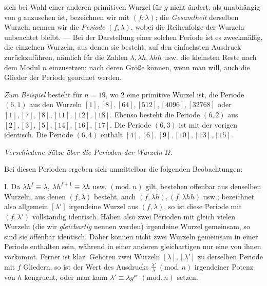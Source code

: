 sich bei Wahl einer anderen primitiven Wurzel für \(g\) nicht ändert, als unabhängig von \(g\) anzusehen ist, bezeichnen wir mit \((f;\allowbreak \lambda)\); die \textit{Gesamtheit} derselben Wurzeln nennen wir die \textit{Periode} \((f,\allowbreak \lambda)\), wobei die Reihenfolge der Wurzeln unbeachtet bleibt. — Bei der Darstellung einer solchen Periode ist es zweckmäßig, die einzelnen Wurzeln, aus denen sie besteht, auf den einfachsten Ausdruck zurückzuführen, nämlich für die Zahlen \(\lambda,\allowbreak \lambda h,\allowbreak \lambda hh\) usw. die kleinsten Reste nach dem Modul \(n\) einzusetzen; nach deren Größe können, wenn man will, auch die Glieder der Periode geordnet werden.

\textit{Zum Beispiel} besteht für \(n=19\), wo \(2\) eine primitive Wurzel ist, die Periode \((6,\allowbreak 1)\) aus den Wurzeln \([1],\allowbreak [8],\allowbreak [64],\allowbreak [512],\allowbreak [4096],\allowbreak [32768]\) oder \([1],\allowbreak [7],\allowbreak [8],\allowbreak [11],\allowbreak [12],\allowbreak [18]\). Ebenso besteht die Periode \((6,\allowbreak 2)\) aus \([2],\allowbreak [3],\allowbreak [5],\allowbreak [14],\allowbreak [16],\allowbreak [17]\). Die Periode \((6,\allowbreak 3)\) ist mit der vorigen identisch. Die Periode \((6,\allowbreak 4)\) enthält \([4],\allowbreak [6],\allowbreak [9],\allowbreak [10],\allowbreak [13],\allowbreak [15]\).

\begin{center}\textit{Verschiedene Sätze über die Perioden der Wurzeln \(\Omega\).}\end{center}


Bei diesen Perioden ergeben sich unmittelbar die folgenden Beobachtungen:

I. Da \(\lambda h^f\equiv\lambda,\allowbreak \ \lambda h^{f+1}\equiv\lambda h\) usw. \((\mathrm{mod.}\ n)\) gilt, bestehen offenbar aus denselben Wurzeln, aus denen \((f,\allowbreak \lambda)\) besteht, auch \((f,\allowbreak \lambda h),\allowbreak (f,\allowbreak \lambda hh)\) usw.; bezeichnet also allgemein \([\lambda']\) irgendeine Wurzel aus \((f,\allowbreak \lambda)\), so ist diese Periode mit \((f,\allowbreak \lambda')\) vollständig identisch. Haben also zwei Perioden mit gleich vielen Wurzeln (die wir \textit{gleichartig} nennen werden) irgendeine Wurzel gemeinsam, so sind sie offenbar identisch. Daher können nicht zwei Wurzeln gemeinsam in einer Periode enthalten sein, während in einer anderen gleichartigen nur eine von ihnen vorkommt. Ferner ist klar: Gehören zwei Wurzeln \([\lambda],\allowbreak [\lambda']\) zu derselben Periode mit \(f\) Gliedern, so ist der Wert des Ausdrucks \(\frac{\lambda'}{\lambda}\ (\mathrm{mod.}\ n)\) irgendeiner Potenz von \(h\) kongruent, oder man kann \(\lambda'\equiv\lambda g^{\nu e}\ (\mathrm{mod.}\ n)\) setzen.

